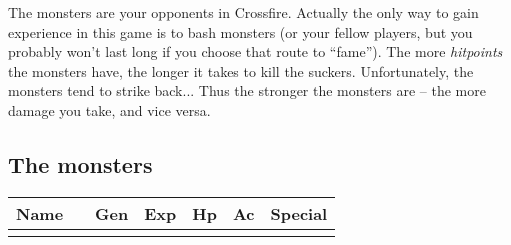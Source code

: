 \documentclass[11pt, a4paper]{article}
\begin{document}
The monsters are your opponents in Crossfire.  Actually the only way
to gain experience in this game is to bash monsters (or your fellow
players, but you probably won't last long if you choose that route to
``fame'').  The more {\it hitpoints} the monsters have, the longer it
takes to kill the suckers.  Unfortunately, the monsters tend to strike
back...  Thus the stronger the monsters are -- the more damage you
take, and vice versa.

{\small
\subsection*{The monsters}
\begin{longtable}{|p{2cm}|c|c|r|r|r|p{5cm}|}
\hline
Name&&Gen&Exp&Hp&Ac&Special\\
\hline
\hline
\endhead
\hline
\endfoot

\end{longtable}
}
\end{document}
